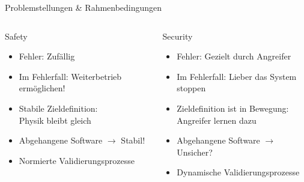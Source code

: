 \begin{frame}[T]{Problemstellungen \& Rahmenbedingungen}
\small
  \begin{columns}[t,fullwidth]
   \hfill
    \begin{column}{.45\linewidth}
      \begin{block}{Safety}
      \begin{itemize}
        \item Fehler: Zufällig
        \item Im Fehlerfall: Weiterbetrieb ermöglichen!
        \item Stabile Zieldefinition:\\Physik bleibt gleich
        \item Abgehangene Software $\rightarrow$ Stabil!
        \item Normierte Validierungsprozesse
      \end{itemize}
      \end{block}
    \end{column}
    \hfill
    \begin{column}{.45\linewidth}
      \begin{block}{Security}
      \begin{itemize}
        \item Fehler: Gezielt durch Angreifer
        \item Im Fehlerfall: Lieber das System stoppen
        \item Zieldefinition ist in Bewegung:\\Angreifer lernen dazu
        \item Abgehangene Software $\rightarrow$ Unsicher?
        \item Dynamische Validierungsprozesse
      \end{itemize}
      \end{block}
    \end{column}
    \hfill
  \end{columns}
\end{frame}


\begingroup
\ExplSyntaxOn
{}
\newcommand*{\Level}[1]{
	\str_case:nnF {#1} {
		{+}{\cellcolor{green3}+}
		{++}{\cellcolor{green2}+\,+}
		{+++}{\cellcolor{green1}+\,+\,+}
		{-}{\cellcolor{red!10}}
	}
	{#1}
}
\ExplSyntaxOff

